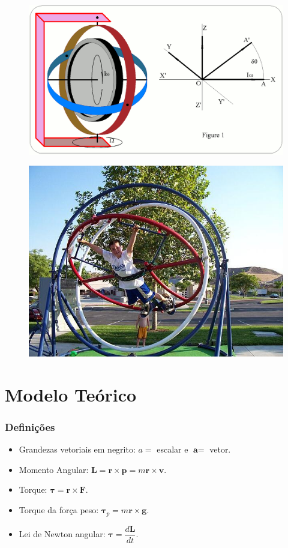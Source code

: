 \documentclass{beamer}
\begin{document}
\begin{frame}
\begin{figure}
\includegraphics[width=4.2 in]{figuras/G1a.png}
\end{figure}
\end{frame}

\begin{frame}
\begin{figure}
\includegraphics[width=3.9 in]{figuras/Human-Gyroscope.jpg}
\end{figure}
\end{frame}



\section{Modelo Teórico}

\begin{frame}
\frametitle{Definições}
\begin{itemize}
\item Grandezas vetoriais em negrito: {\color{red}$a=$} escalar e {\color{red}$\textbf{a}=$} vetor.
\item Momento Angular: {\color{red}$\textbf{L} = \textbf{r} \times \textbf{p} = m\textbf{r} \times \textbf{v} $}.
\item Torque: {\color{red}$\bm{\tau} = \textbf{r} \times \textbf{F}$}.
\item Torque da força peso: {\color{red}$\bm{\tau}_p = m\textbf{r} \times \textbf{g}$}.
\item Lei de Newton angular: {\color{red}$\bm{\tau} = \dfrac{d\textbf{L}}{dt}$}.
\end{itemize}
\end{frame}
\end{document}
